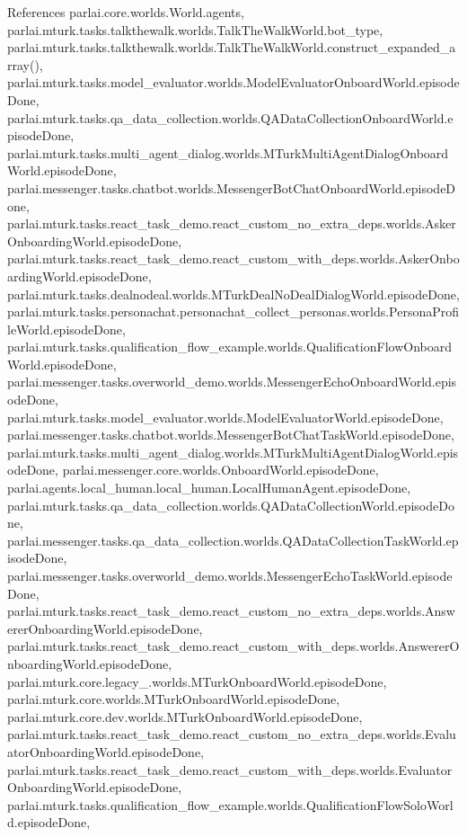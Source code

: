 References parlai.\+core.\+worlds.\+World.\+agents, parlai.\+mturk.\+tasks.\+talkthewalk.\+worlds.\+Talk\+The\+Walk\+World.\+bot\+\_\+type, parlai.\+mturk.\+tasks.\+talkthewalk.\+worlds.\+Talk\+The\+Walk\+World.\+construct\+\_\+expanded\+\_\+array(), parlai.\+mturk.\+tasks.\+model\+\_\+evaluator.\+worlds.\+Model\+Evaluator\+Onboard\+World.\+episode\+Done, parlai.\+mturk.\+tasks.\+qa\+\_\+data\+\_\+collection.\+worlds.\+Q\+A\+Data\+Collection\+Onboard\+World.\+episode\+Done, parlai.\+mturk.\+tasks.\+multi\+\_\+agent\+\_\+dialog.\+worlds.\+M\+Turk\+Multi\+Agent\+Dialog\+Onboard\+World.\+episode\+Done, parlai.\+messenger.\+tasks.\+chatbot.\+worlds.\+Messenger\+Bot\+Chat\+Onboard\+World.\+episode\+Done, parlai.\+mturk.\+tasks.\+react\+\_\+task\+\_\+demo.\+react\+\_\+custom\+\_\+no\+\_\+extra\+\_\+deps.\+worlds.\+Asker\+Onboarding\+World.\+episode\+Done, parlai.\+mturk.\+tasks.\+react\+\_\+task\+\_\+demo.\+react\+\_\+custom\+\_\+with\+\_\+deps.\+worlds.\+Asker\+Onboarding\+World.\+episode\+Done, parlai.\+mturk.\+tasks.\+dealnodeal.\+worlds.\+M\+Turk\+Deal\+No\+Deal\+Dialog\+World.\+episode\+Done, parlai.\+mturk.\+tasks.\+personachat.\+personachat\+\_\+collect\+\_\+personas.\+worlds.\+Persona\+Profile\+World.\+episode\+Done, parlai.\+mturk.\+tasks.\+qualification\+\_\+flow\+\_\+example.\+worlds.\+Qualification\+Flow\+Onboard\+World.\+episode\+Done, parlai.\+messenger.\+tasks.\+overworld\+\_\+demo.\+worlds.\+Messenger\+Echo\+Onboard\+World.\+episode\+Done, parlai.\+mturk.\+tasks.\+model\+\_\+evaluator.\+worlds.\+Model\+Evaluator\+World.\+episode\+Done, parlai.\+messenger.\+tasks.\+chatbot.\+worlds.\+Messenger\+Bot\+Chat\+Task\+World.\+episode\+Done, parlai.\+mturk.\+tasks.\+multi\+\_\+agent\+\_\+dialog.\+worlds.\+M\+Turk\+Multi\+Agent\+Dialog\+World.\+episode\+Done, parlai.\+messenger.\+core.\+worlds.\+Onboard\+World.\+episode\+Done, parlai.\+agents.\+local\+\_\+human.\+local\+\_\+human.\+Local\+Human\+Agent.\+episode\+Done, parlai.\+mturk.\+tasks.\+qa\+\_\+data\+\_\+collection.\+worlds.\+Q\+A\+Data\+Collection\+World.\+episode\+Done, parlai.\+messenger.\+tasks.\+qa\+\_\+data\+\_\+collection.\+worlds.\+Q\+A\+Data\+Collection\+Task\+World.\+episode\+Done, parlai.\+messenger.\+tasks.\+overworld\+\_\+demo.\+worlds.\+Messenger\+Echo\+Task\+World.\+episode\+Done, parlai.\+mturk.\+tasks.\+react\+\_\+task\+\_\+demo.\+react\+\_\+custom\+\_\+no\+\_\+extra\+\_\+deps.\+worlds.\+Answerer\+Onboarding\+World.\+episode\+Done, parlai.\+mturk.\+tasks.\+react\+\_\+task\+\_\+demo.\+react\+\_\+custom\+\_\+with\+\_\+deps.\+worlds.\+Answerer\+Onboarding\+World.\+episode\+Done, parlai.\+mturk.\+core.\+legacy\+\_.\+worlds.\+M\+Turk\+Onboard\+World.\+episode\+Done, parlai.\+mturk.\+core.\+worlds.\+M\+Turk\+Onboard\+World.\+episode\+Done, parlai.\+mturk.\+core.\+dev.\+worlds.\+M\+Turk\+Onboard\+World.\+episode\+Done, parlai.\+mturk.\+tasks.\+react\+\_\+task\+\_\+demo.\+react\+\_\+custom\+\_\+no\+\_\+extra\+\_\+deps.\+worlds.\+Evaluator\+Onboarding\+World.\+episode\+Done, parlai.\+mturk.\+tasks.\+react\+\_\+task\+\_\+demo.\+react\+\_\+custom\+\_\+with\+\_\+deps.\+worlds.\+Evaluator\+Onboarding\+World.\+episode\+Done, parlai.\+mturk.\+tasks.\+qualification\+\_\+flow\+\_\+example.\+worlds.\+Qualification\+Flow\+Solo\+World.\+episode\+Done, 
